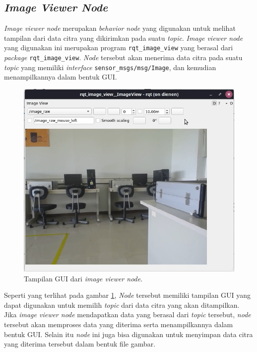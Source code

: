 \subsection{\emph{Image Viewer Node}}
\label{subsec:imageviewernode}

\emph{Image viewer node} merupakan \emph{behavior node} yang digunakan untuk melihat tampilan dari data citra yang dikirimkan pada suatu \emph{topic}.
\emph{Image viewer node} yang digunakan ini merupakan program \lstinline{rqt_image_view} yang berasal dari \emph{package} \lstinline{rqt_image_view}.
\emph{Node} tersebut akan menerima data citra pada suatu \emph{topic} yang memiliki \emph{interface} \lstinline{sensor_msgs/msg/Image},
  dan kemudian menampilkannya dalam bentuk GUI.

\begin{figure}[ht]
  \centering
  \includegraphics[scale=0.55]{gambar/tampilan-image-viewer.png}
  \caption{Tampilan GUI dari \emph{image viewer node}.}
  \label{fig:tampilanimageviewer}
\end{figure}

Seperti yang terlihat pada gambar \ref{fig:tampilanimageviewer},
  \emph{Node} tersebut memiliki tampilan GUI yang dapat digunakan untuk memilih \emph{topic} dari data citra yang akan ditampilkan.
Jika \emph{image viewer node} mendapatkan data yang berasal dari \emph{topic} tersebut,
  \emph{node} tersebut akan memproses data yang diterima serta menampilkannya dalam bentuk GUI.
Selain itu \emph{node} ini juga bisa digunakan untuk menyimpan data citra yang diterima tersebut dalam bentuk file gambar.
